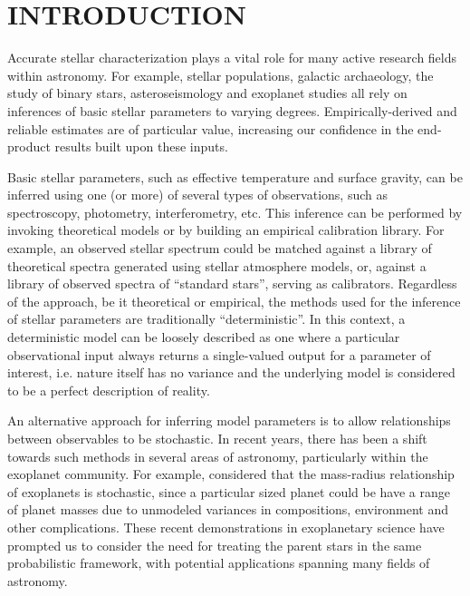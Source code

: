 \documentclass[apjl]{emulateapj}
\begin{document}

\section{INTRODUCTION}
\label{sec:intro}


Accurate stellar characterization plays a vital role for many active research
fields within astronomy. For example, stellar populations, galactic
archaeology, the study of binary stars, asteroseismology and exoplanet studies
all rely on inferences of basic stellar parameters to varying degrees.
Empirically-derived and reliable estimates are of particular value, increasing
our confidence in the end-product results built upon these inputs.

Basic stellar parameters, such as effective temperature and surface gravity,
can be inferred using one (or more) of several types of observations, such as
spectroscopy, photometry, interferometry, etc. This inference can be performed
by invoking theoretical models or by building an empirical calibration
library.
For example, an observed stellar spectrum could be matched against a library of
theoretical spectra generated using stellar atmosphere models, or, against a
library of observed spectra of ``standard stars'', serving as calibrators.
Regardless of the approach, be it theoretical or empirical, the methods used
for the inference of stellar parameters are traditionally ``deterministic''.
In this context, a deterministic model can be loosely described as one where
a particular observational input always returns a single-valued output for a
parameter of interest, i.e. nature itself has no variance and the underlying
model is considered to be a perfect description of reality.

An alternative approach for inferring model parameters is to allow
relationships between observables to be stochastic.
In recent years, there has been a shift towards such methods in several areas
of astronomy, particularly within the exoplanet community.
For example, \citet{wolfgang:2015} considered that the mass-radius
relationship of exoplanets is stochastic, since a particular sized planet
could be have a range of planet masses due to unmodeled variances in
compositions, environment and other complications.
These recent demonstrations in exoplanetary science have prompted us to
consider the need for treating the parent stars in the same probabilistic
framework, with potential applications spanning many fields of astronomy.
\end{document}
